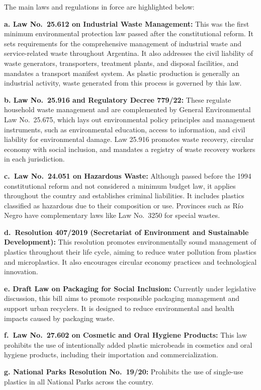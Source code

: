 \documentclass[
  12pt,
  oneside]{book}
\begin{document}
The main laws and regulations in force are highlighted below:

\textbf{a. Law No.~25.612 on Industrial Waste Management:} This was the
first minimum environmental protection law passed after the
constitutional reform. It sets requirements for the comprehensive
management of industrial waste and service-related waste throughout
Argentina. It also addresses the civil liability of waste generators,
transporters, treatment plants, and disposal facilities, and mandates a
transport manifest system. As plastic production is generally an
industrial activity, waste generated from this process is governed by
this law.

\textbf{b. Law No.~25.916 and Regulatory Decree 779/22:} These regulate
household waste management and are complemented by General Environmental
Law No.~25.675, which lays out environmental policy principles and
management instruments, such as environmental education, access to
information, and civil liability for environmental damage. Law 25.916
promotes waste recovery, circular economy with social inclusion, and
mandates a registry of waste recovery workers in each jurisdiction.

\textbf{c.~Law No.~24.051 on Hazardous Waste:} Although passed before
the 1994 constitutional reform and not considered a minimum budget law,
it applies throughout the country and establishes criminal liabilities.
It includes plastics classified as hazardous due to their composition or
use. Provinces such as Río Negro have complementary laws like Law
No.~3250 for special wastes.

\textbf{d.~Resolution 407/2019 (Secretariat of Environment and
Sustainable Development):} This resolution promotes environmentally
sound management of plastics throughout their life cycle, aiming to
reduce water pollution from plastics and microplastics. It also
encourages circular economy practices and technological innovation.

\textbf{e. Draft Law on Packaging for Social Inclusion:} Currently under
legislative discussion, this bill aims to promote responsible packaging
management and support urban recyclers. It is designed to reduce
environmental and health impacts caused by packaging waste.

\textbf{f.~Law No.~27.602 on Cosmetic and Oral Hygiene Products:} This
law prohibits the use of intentionally added plastic microbeads in
cosmetics and oral hygiene products, including their importation and
commercialization.

\textbf{g. National Parks Resolution No.~19/20:} Prohibits the use of
single-use plastics in all National Parks across the country.
\end{document}
